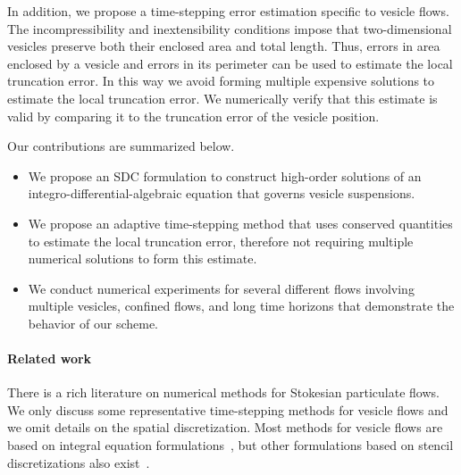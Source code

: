 In addition, we propose a time-stepping error estimation specific to
vesicle flows.  The incompressibility and inextensibility conditions
impose that two-dimensional vesicles preserve both their enclosed area
and total length. Thus, errors in area enclosed by a vesicle and errors
in its perimeter can be used to estimate the local truncation error.
In this way we avoid forming multiple expensive solutions to estimate
the local truncation error.  We numerically verify that this estimate
is valid by comparing it to the truncation error of the vesicle
position.

Our contributions are summarized below.
\begin{itemize}
  \item We propose an SDC formulation to construct high-order solutions
  of an integro-differential-algebraic equation that governs vesicle
  suspensions.

  \item We propose an adaptive time-stepping method that uses conserved
  quantities to estimate the local truncation error, therefore not
  requiring multiple numerical solutions to form this estimate.

  \item We conduct numerical experiments for several different flows
  involving multiple vesicles, confined flows, and long time horizons
  that demonstrate the behavior of our scheme.
\end{itemize}


\paragraph{Related work}
There is a rich literature on numerical methods for Stokesian
particulate flows. We only discuss some representative time-stepping
methods for vesicle flows and we omit details on the spatial
discretization. Most methods for vesicle flows are based on integral
equation formulations~\cite{ram:poz1998, soh:tse:li:voi:low2010,
suk:sei2001, zha:sha2013b,
rah:las:vee:cha:mal:moo:sam:shr:vet:vud:zor:bir2010,
rah:vee:bir2010,vee:gue:zor:bir2009, vee:rah:bir:zor2011,zha:sha2011a},
but other formulations based on stencil discretizations also
exist~\cite{laa:sar:mis2014, bib:kas:mis2005, du:zha2008, kim:lai2010}.

